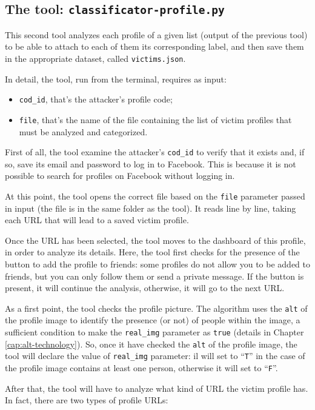 \subsection{The tool: \texttt{classificator-profile.py}}
\label{cap:classificator-profiles}
This second tool analyzes each profile of a given list (output of the previous tool) to be able to attach to each of them its corresponding label, and then save them in the appropriate dataset, called \texttt{victims.json}.\par \noindent In detail, the tool, run from the terminal, requires as input:
\begin{itemize}
	\item \texttt{cod\_id}, that's the attacker's profile code;
	\item \texttt{file}, that's the name of the file containing the list of victim profiles that must be analyzed and categorized.
\end{itemize}
First of all, the tool examine the attacker's \texttt{cod\_id} to verify that it exists and, if so, save its email and password to log in to Facebook. This is because it is not possible to search for profiles on Facebook without logging in.
\par \noindent At this point, the tool opens the correct file based on the \texttt{file} parameter passed in input (the file is in the same folder as the tool).
It reads line by line, taking each URL that will lead to a saved victim profile.\par \noindent Once the URL has been selected, the tool moves to the dashboard of this profile, in order to analyze its details. Here, the tool first checks for the presence of the button to add the profile to friends: some profiles do not allow you to be added to friends, but you can only follow them or send a private message. If the button is present, it will continue the analysis, otherwise, it will go to the next URL.
\par \noindent  As a first point, the tool checks the profile picture.
The algorithm uses the \texttt{alt} of the profile image to identify the presence (or not) of people within the image, a sufficient condition to make the \texttt{real\_img} parameter as \texttt{true} (details in Chapter \ref{cap:alt-technology}). So, once it have checked the \texttt{alt} of the profile image, the tool will declare the value of \texttt{real\_img} parameter: il will set to ``\texttt{T}'' in the case of the profile image contains at least one person, otherwise it will set to ``\texttt{F}''.
\par \noindent After that, the tool will have to analyze what kind of URL the victim profile has. In fact, there are two types of profile URLs:
